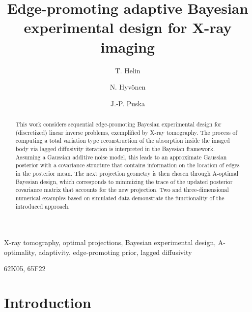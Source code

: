 \documentclass[final]{siamltex}
\title{Edge-promoting adaptive Bayesian experimental design for X-ray imaging}
\author{
T. Helin\footnotemark[2]
\and N. Hyv\"onen\footnotemark[3]
\and J.-P. Puska\footnotemark[3]
}
\begin{document}
\maketitle

\renewcommand{\thefootnote}{\fnsymbol{footnote}}



\begin{abstract}
  This work considers sequential edge-promoting Bayesian experimental design for (discretized) linear inverse problems, exemplified by X-ray tomography. The process of computing a total variation type reconstruction of the absorption inside the imaged body via lagged diffusivity iteration is interpreted in the Bayesian framework. Assuming a Gaussian additive noise model, this leads to an approximate Gaussian posterior with a covariance structure that contains information on the location of edges in the posterior mean. The next projection geometry is then chosen through A-optimal Bayesian design, which corresponds to minimizing the trace of the updated posterior covariance matrix that accounts for the new projection. Two and three-dimensional numerical examples based on simulated data demonstrate the functionality of the introduced approach.
\end{abstract}

\renewcommand{\thefootnote}{\arabic{footnote}}

\begin{keywords}
X-ray tomography, optimal projections, Bayesian experimental design, A-optimality, adaptivity, edge-promoting prior, lagged diffusivity
\end{keywords}

\begin{AMS}
62K05, 65F22
\end{AMS}

\pagestyle{myheadings}
\thispagestyle{plain}

\section{Introduction}
\label{sec:introduction}
\end{document}
